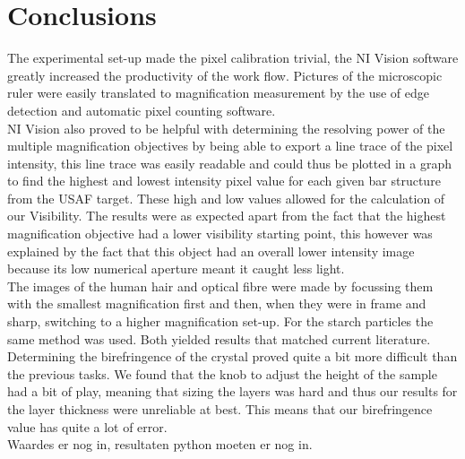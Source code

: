 \section{Conclusions}
The experimental set-up made the pixel calibration trivial, the NI Vision software greatly increased the productivity of the work flow. Pictures of the microscopic ruler were easily translated to magnification measurement by the use of edge detection and automatic pixel counting software.\\
NI Vision also proved to be helpful with determining the resolving power of the multiple magnification objectives by being able to export a line trace of the pixel intensity, this line trace was easily readable and could thus be plotted in a graph to find the highest and lowest intensity pixel value for each given bar structure from the USAF target. These high and low values allowed for the calculation of our Visibility. The results were as expected apart from the fact that the highest magnification objective had a lower visibility starting point, this however was explained by the fact that this object had an overall lower intensity image because its low numerical aperture meant it caught less light.\\
The images of the human hair and optical fibre were made by focussing them with the smallest magnification first and then, when they were in frame and sharp, switching to a higher magnification set-up. For the starch particles the same method was used. Both yielded results that matched current literature.\\
Determining the birefringence of the crystal proved quite a bit more difficult than the previous tasks. We found that the knob to adjust the height of the sample had a bit of play, meaning that sizing the layers was hard and thus our results for the layer thickness were unreliable at best. This means that our birefringence value has quite a lot of error.
\\
Waardes er nog in, resultaten python moeten er nog in.\\
\\






\begin{comment}

In theConclusies (Conclusions) chapter\\-You give a clear and concise answer to the research question that was formulated in the Intrduction\\-You discuss  to  what  extent,  and  why,  your  findings  do  (not)  agree  with  theory/expectations/earlier  work,   you   discuss   more   speculative   conclusions,   ad   you   may   do   suggestions   for   further   (improved/extended) research.The  Conclusions  should  be  self-contained  and  understandable  for  readers  that  have  only  read  the  introduction  (and  have  not  read the  rest  of  your    report,  do  not  know  the  literature,  do  not  know  the  experimental  setup  and  have  not  read  the  RP  manual).   In  the  Conclusions  chapter,  you  may  not  make  references to graps, tables, equations etc. in the remainder of the report.

\end{comment}